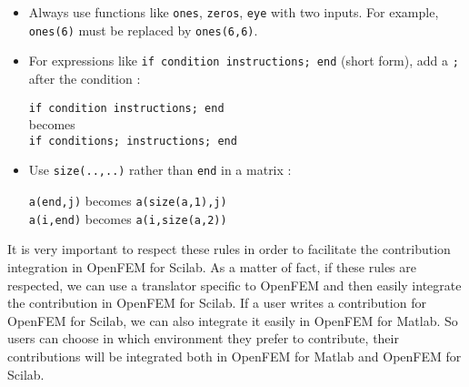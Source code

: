 \begin{itemize}
\item Always use functions like \verb+ones+, \verb+zeros+, \verb+eye+ with two inputs. For example, \verb+ones(6)+ must be replaced by \verb+ones(6,6)+.

\item For expressions like \verb+if condition instructions; end+ (short form), add a \verb+;+ after the condition :
\vspace{-0.3cm}
\begin{center}
\verb+if condition instructions; end+\\ becomes \\\verb+if conditions; instructions; end+
\end{center}

\item Use \verb+size(..,..)+ rather than \verb+end+ in a matrix :
\vspace{-0.3cm}
\begin{center}
\verb+a(end,j)+ becomes \verb+a(size(a,1),j)+\\
\verb+a(i,end)+ becomes \verb+a(i,size(a,2))+\\
\end{center}

\end{itemize}
It is very important to respect these rules in order to facilitate the contribution integration in OpenFEM for Scilab. As a matter of fact, if these rules are respected, we can use a translator specific to OpenFEM and then easily integrate the contribution in OpenFEM for Scilab. If a user writes a contribution for OpenFEM for Scilab, we can also integrate it easily in OpenFEM for Matlab. So users can choose in which environment they prefer to contribute, their contributions will be integrated both in OpenFEM for Matlab and OpenFEM for Scilab.


